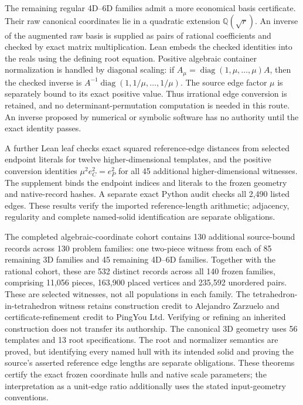 \documentclass[11pt,a4paper]{article}
\newcommand{\Q}{\mathbb Q}
\newcommand{\leanAlgebraicRecords}{130}
\newcommand{\leanAlgebraicFamilies}{130}
\begin{document}
The remaining regular 4D--6D families admit a more economical basis certificate. Their raw canonical coordinates lie in a quadratic extension $\Q(\sqrt r)$. An inverse of the augmented raw basis is supplied as pairs of rational coefficients and checked by exact matrix multiplication. Lean embeds the checked identities into the reals using the defining root equation. Positive algebraic container normalization is handled by diagonal scaling: if $A_\mu=\operatorname{diag}(1,\mu,\ldots,\mu)A$, then the checked inverse is $A^{-1}\operatorname{diag}(1,1/\mu,\ldots,1/\mu)$. The source edge factor $\mu$ is separately bound to its exact positive value. Thus irrational edge conversion is retained, and no determinant-permutation computation is needed in this route. An inverse proposed by numerical or symbolic software has no authority until the exact identity passes.

A further Lean leaf checks exact squared reference-edge distances from selected endpoint literals for twelve higher-dimensional templates, and the positive conversion identities $\mu^2 e_C^2=e_P^2$ for all 45 additional higher-dimensional witnesses. The supplement binds the endpoint indices and literals to the frozen geometry and native-record hashes. A separate exact Python audit checks all 2,490 listed edges. These results verify the imported reference-length arithmetic; adjacency, regularity and complete named-solid identification are separate obligations.

The completed algebraic-coordinate cohort contains \leanAlgebraicRecords{} additional source-bound records across \leanAlgebraicFamilies{} problem families: one two-piece witness from each of 85 remaining 3D families and 45 remaining 4D--6D families. Together with the rational cohort, these are 532 distinct records across all 140 frozen families, comprising 11,056 pieces, 163,900 placed vertices and 235,592 unordered pairs. These are selected witnesses, not all populations in each family. The tetrahedron-in-tetrahedron witness retains construction credit to Alejandro Zarzuelo and certificate-refinement credit to PingYou Ltd. Verifying or refining an inherited construction does not transfer its authorship. The canonical 3D geometry uses 56 templates and 13 root specifications. The root and normalizer semantics are proved, but identifying every named hull with its intended solid and proving the source's asserted reference edge lengths are separate obligations. These theorems certify the exact frozen coordinate hulls and native scale parameters; the interpretation as a unit-edge ratio additionally uses the stated input-geometry conventions.
\end{document}
